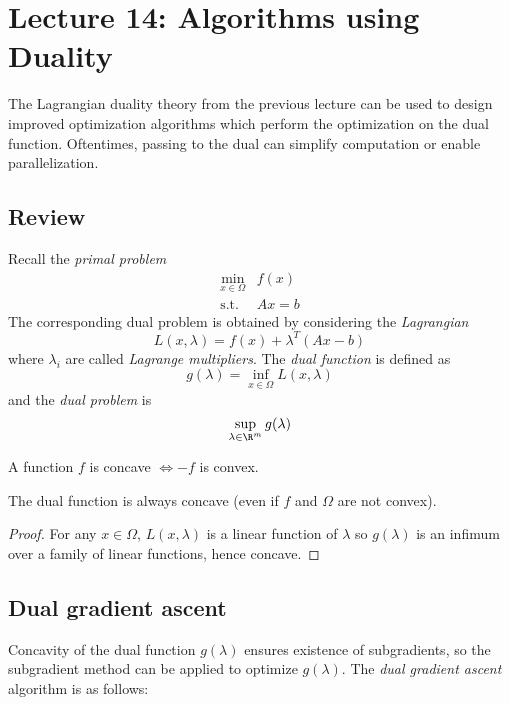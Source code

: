 \section{Lecture 14: Algorithms using Duality}

The Lagrangian duality theory from the previous lecture can be used to
design improved optimization algorithms which perform the optimization
on the dual function. Oftentimes, passing to the dual can simplify
computation or enable parallelization.

\subsection{Review}

Recall the \emph{primal problem}
\begin{align}
\min_{x \in \Omega} &f(x) \\
\text{s.t.}~& A x = b
\end{align}
The corresponding dual problem is obtained by considering the
\emph{Lagrangian}
\[
L(x,\lambda) = f(x) + \lambda^T(A x  - b)
\]
where $\lambda_i$ are called \emph{Lagrange multipliers}. The
\emph{dual function} is defined as
\[
g(\lambda) = \inf_{x \in \Omega} L(x,\lambda)
\]
and the \emph{dual problem} is
\[
\sup_{\lambda \in \R^m} g(\lambda)
\]

\begin{definition}
A function $f$ is concave $\iff -f$ is convex.
\end{definition}

\begin{fact}
The dual function is always concave (even if $f$ and
$\Omega$ are not convex).
\end{fact}

\begin{proof}
For any $x \in \Omega$,
$L(x,\lambda)$ is a linear function of $\lambda$ so $g(\lambda)$
is an infimum over a family of linear functions, hence concave.
\end{proof}

\subsection{Dual gradient ascent}

Concavity of the dual function $g(\lambda)$ ensures existence of
subgradients, so the subgradient method can be applied to optimize $g(\lambda)$.
The \emph{dual gradient ascent} algorithm is as follows:

